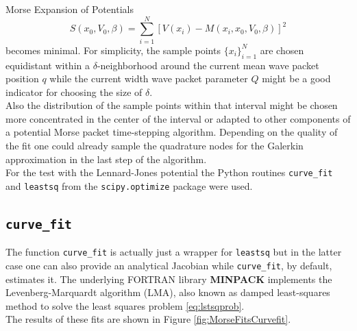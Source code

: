 \begin{chapter}{Morse Expansion of Potentials}
\begin{equation}
    \label{eq:lstsqprob}
    S(x_0, V_0, \beta)=\sum_{i=1}^N[V(x_i)-M(x_i,x_0,V_0, \beta)]^2 
\end{equation}
becomes minimal. For simplicity, the sample points $\lbrace x_i\rbrace_{i=1}^N$ are chosen equidistant within a $\delta$-neighborhood around 
the current mean wave packet position $q$ while the current width wave packet parameter $Q$ might be a good indicator for choosing the size
of $\delta$. \\
Also the distribution of the sample points within that interval might be chosen more concentrated in the center of the interval or adapted
to other components of a potential Morse packet time-stepping algorithm. Depending on the quality of the fit one could already sample
the quadrature nodes for the Galerkin approximation in the last step of the algorithm.\\

For the test with the Lennard-Jones potential the Python routines \texttt{curve\_fit} and \texttt{leastsq} from the \texttt{scipy.optimize}
package were used. \\


\subsection{\texttt{curve\_fit}} %
\label{sub:curve_fit}
The function \texttt{curve\_fit} is actually just  a wrapper for \texttt{leastsq} but in the latter case one can also provide an analytical Jacobian while
\texttt{curve\_fit}, by default, estimates it. The underlying FORTRAN library \textbf{MINPACK} implements the Levenberg-Marquardt algorithm (LMA),
also known as damped least-squares method to solve the least squares problem \eqref{eq:lstsqprob}.\\
The results of these fits are shown in Figure \ref{fig:MorseFitsCurvefit}.


\end{chapter}
